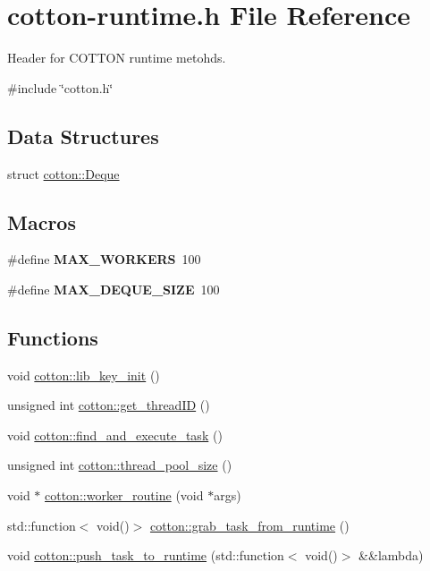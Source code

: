 \hypertarget{cotton-runtime_8h}{}\section{cotton-\/runtime.h File Reference}
\label{cotton-runtime_8h}


Header for C\+O\+T\+T\+ON runtime metohds.  


{\ttfamily \#include \char`\"{}cotton.\+h\char`\"{}}\newline
\subsection*{Data Structures}
\begin{DoxyCompactItemize}
\item 
struct \mbox{\hyperlink{structcotton_1_1Deque}{cotton\+::\+Deque}}
\end{DoxyCompactItemize}
\subsection*{Macros}
\begin{DoxyCompactItemize}
\item 
\mbox{\label{cotton-runtime_8h_a7553a3b6420fd55ba1caaf53d271f1f8}} 
\#define {\bfseries M\+A\+X\+\_\+\+W\+O\+R\+K\+E\+RS}~100
\item 
\mbox{\label{cotton-runtime_8h_a3711c2164495f38abd986d3d893c1c3c}} 
\#define {\bfseries M\+A\+X\+\_\+\+D\+E\+Q\+U\+E\+\_\+\+S\+I\+ZE}~100
\end{DoxyCompactItemize}
\subsection*{Functions}
\begin{DoxyCompactItemize}
\item 
void \mbox{\hyperlink{cotton-runtime_8h_a4ea9036584fa3bd86fe8626dc05d295f}{cotton\+::lib\+\_\+key\+\_\+init}} ()
\item 
unsigned int \mbox{\hyperlink{cotton-runtime_8h_ab1ebe1f6821a54e7c4911c22acebff8a}{cotton\+::get\+\_\+thread\+ID}} ()
\item 
void \mbox{\hyperlink{cotton-runtime_8h_af22caee9434a7e06a09b2f9a0417c1eb}{cotton\+::find\+\_\+and\+\_\+execute\+\_\+task}} ()
\item 
unsigned int \mbox{\hyperlink{cotton-runtime_8h_a0b32dd3b6a3d126e107d5c77ec1f4cc3}{cotton\+::thread\+\_\+pool\+\_\+size}} ()
\item 
void $\ast$ \mbox{\hyperlink{cotton-runtime_8h_a361c34063ecb68cf02d417074decb12b}{cotton\+::worker\+\_\+routine}} (void $\ast$args)
\item 
std\+::function$<$ void()$>$ \mbox{\hyperlink{cotton-runtime_8h_afaca8aa46092d066bf1d996ae09fb83d}{cotton\+::grab\+\_\+task\+\_\+from\+\_\+runtime}} ()
\item 
void \mbox{\hyperlink{cotton-runtime_8h_a2b2001813bd051cd1ff41a75989667c0}{cotton\+::push\+\_\+task\+\_\+to\+\_\+runtime}} (std\+::function$<$ void()$>$ \&\&lambda)
\end{DoxyCompactItemize}


